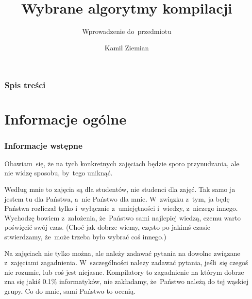 \documentclass[10pt,t]{beamer}
\title{Wybrane algorytmy kompilacji}
\subtitle{Wprowadzenie do~przedmiotu}
\author{Kamil Ziemian \\
  \email}
\begin{document}





\RaggedRight





\maketitle





\begin{frame}
  \frametitle{Spis treści}


  \tableofcontents

\end{frame}





\section{Informacje ogólne}





\begin{frame}
  \frametitle{Informacje wstępne}


  Obawiam~się, że na tych konkretnych zajęciach będzie sporo przynudzania,
  ale nie widzę sposobu, by~tego uniknąć.

  Według mnie to zajęcia są dla studentów, nie studenci dla zajęć. Tak samo
  ja jestem tu dla Państwa, a~nie Państwo dla mnie. W~związku z~tym, ja
  będę Państwa rozliczał tylko i~wyłącznie z~umiejętności i~wiedzy,
  z~niczego innego. Wychodzę bowiem z~założenia, że~Państwo sami najlepiej
  wiedzą, czemu warto poświęcić swój czas. (Choć jak dobrze wiemy, często
  po jakimś czasie stwierdzamy, że~może trzeba było wybrać coś innego.)

  Na zajęciach nie tylko można, ale \alert{należy} zadawać pytania
  na dowolne związane z~zajęciami zagadnienia. W~szczególności
  \alert{należy} zadawać pytania, jeśli~się czegoś nie rozumie, lub coś
  jest niejasne. Kompilatory to zagadnienie na którym dobrze zna się jakiś
  0.1\% informatyków, \alert{nie} zakładamy, że~Państwo należą do tej
  wąskiej grupy. Co do mnie, sami Państwo to ocenią.

\end{frame}
\end{document}
